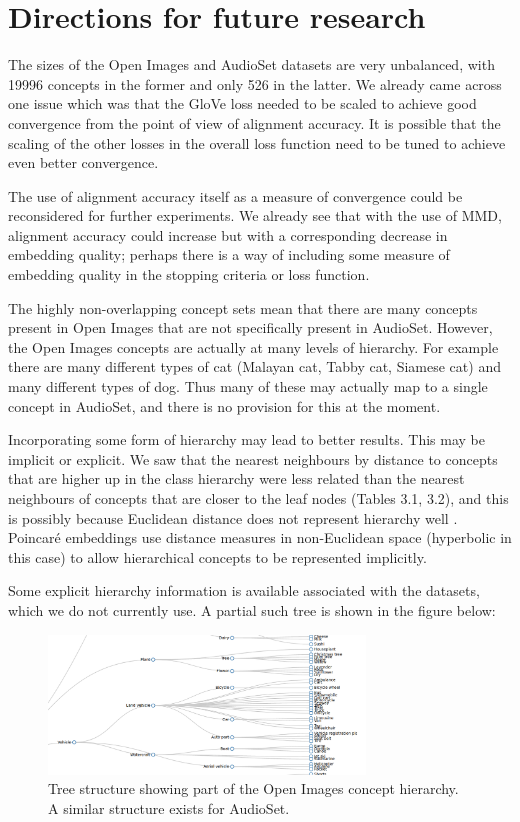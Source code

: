 \section{Directions for future research}

The sizes of the Open Images and AudioSet datasets are very unbalanced, with 19996 concepts in the former and only 526 in the latter. We already came across one issue which was that the GloVe loss needed to be scaled to achieve good convergence from the point of view of alignment accuracy. It is possible that the scaling of the other losses in the overall loss function need to be tuned to achieve even better convergence. 

The use of alignment accuracy itself as a measure of convergence could be reconsidered for further experiments. We already see that with the use of MMD, alignment accuracy could increase but with a corresponding decrease in embedding quality; perhaps there is a way of including some measure of embedding quality in the stopping criteria or loss function.  

The highly non-overlapping concept sets mean that there are many concepts present in Open Images that are not specifically present in AudioSet. However, the Open Images concepts are actually at many levels of hierarchy. For example there are many different types of cat (Malayan cat, Tabby cat, Siamese cat) and many different types of dog. Thus many of these may actually map to a single concept in AudioSet, and there is no provision for this at the moment. 

Incorporating some form of hierarchy may lead to better results. This may be implicit or explicit.   We saw that the nearest neighbours by distance to concepts that are higher up in the class hierarchy were less related than the nearest neighbours of concepts that are closer to the leaf nodes (Tables 3.1, 3.2), and this is possibly because Euclidean distance does not represent hierarchy well \cite{NNAnalysisPsychologicalSpaces}. Poincar{\'{e}} embeddings \cite{PoincareEmbeddings} use distance measures in non-Euclidean space (hyperbolic in this case) to allow hierarchical concepts to be represented implicitly.

Some explicit hierarchy information is available associated with the datasets, which we do not currently use. A partial such tree is shown in the figure below:

\begin{figure}[H]
\label{fig:tree}
    \centering
    \includegraphics[width=0.75\textwidth]{images/conclusions/tree.png}
    \caption{
        Tree structure showing part of the Open Images concept hierarchy. A similar structure exists for AudioSet.
    }
\end{figure}

